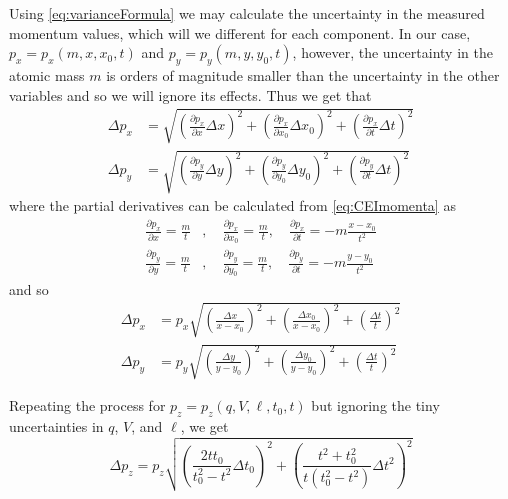 Using \eqref{eq:varianceFormula} we may calculate the uncertainty in the measured momentum values, which will we different for each component. In our case, $p_x = p_x(m,x,x_0,t)$ and $p_y = p_y(m,y,y_0,t)$, however, the uncertainty in the atomic mass $m$ is orders of magnitude smaller than the uncertainty in the other variables and so we will ignore its effects. Thus we get that
\begin{subequations}
  \begin{align}
  \Delta p_x &= \sqrt{
    \left( \frac{\partial p_x}{\partial x}\Delta x \right)^2
    + \left( \frac{\partial p_x}{\partial x_0}\Delta x_0 \right)^2
    + \left(\frac{\partial p_x}{\partial t}\Delta t \right)^2
   } \\
  \Delta p_y &= \sqrt{
    \left( \frac{\partial p_y}{\partial y}\Delta y \right)^2
    + \left(\frac{\partial p_y}{\partial y_0}\Delta y_0 \right)^2
    + \left(\frac{\partial p_y}{\partial t}\Delta t \right)^2
  }
  \end{align}
\end{subequations}
where the partial derivatives can be calculated from \eqref{eq:CEImomenta} as
\begin{subequations}
  \begin{align}
  \frac{\partial p_x}{\partial x} = \frac{m}{t} &,\quad \frac{\partial p_x}{\partial x_0} = \frac{m}{t} ,\quad \frac{\partial p_x}{\partial t} = -m\frac{x-x_0}{t^2}\\
  \frac{\partial p_y}{\partial y} = \frac{m}{t} &,\quad \frac{\partial p_y}{\partial y_0} = \frac{m}{t} ,\quad \frac{\partial p_y}{\partial t} = -m\frac{y-y_0}{t^2}
  \end{align}
\end{subequations}
and so
\begin{subequations}
  \begin{align}
  \Delta p_x &= p_x \sqrt{
    \left( \frac{\Delta x}{x - x_0} \right)^2
    + \left( \frac{\Delta x_0}{x - x_0} \right)^2
    + \left( \frac{\Delta t}{t} \right)^2 } \\
  \Delta p_y &= p_y \sqrt{
    \left( \frac{\Delta y}{y - y_0} \right)^2
    + \left( \frac{\Delta y_0}{y - y_0} \right)^2
    + \left( \frac{\Delta t}{t} \right)^2 }
  \end{align}
\end{subequations}

Repeating the process for $p_z = p_z(q,V,\ell,t_0,t)$ but ignoring the tiny uncertainties in $q$, $V$, and $\ell$, we get
\begin{equation}
\Delta p_z = p_z \sqrt{
  \left( \frac{2tt_0}{t_0^2 - t^2} \Delta t_0 \right)^2
  + \left( \frac{t^2 + t_0^2}{t(t_0^2 - t^2)} \Delta t^2 \right)^2
}
\end{equation}

